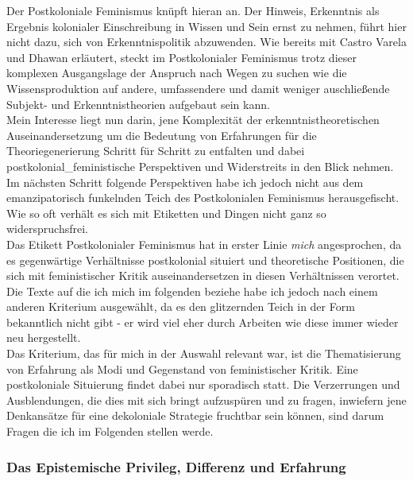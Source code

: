 Der Postkoloniale Feminismus knüpft hieran an. Der Hinweis, Erkenntnis als
Ergebnis kolonialer Einschreibung in Wissen und Sein ernst zu nehmen, führt
hier nicht dazu, sich von Erkenntnispolitik abzuwenden. Wie bereits mit Castro
Varela und Dhawan erläutert, steckt im Postkolonialer Feminismus trotz dieser
komplexen Ausgangslage der Anspruch nach Wegen zu suchen wie die
Wissensproduktion auf andere, umfassendere und damit weniger auschließende
Subjekt- und Erkenntnistheorien aufgebaut sein kann. \\
Mein Interesse liegt nun
darin, jene Komplexität der erkenntnistheoretischen Auseinandersetzung um die
Bedeutung von Erfahrungen für die Theoriegenerierung Schritt für Schritt zu
entfalten und dabei postkolonial\_feministische Perspektiven und Widerstreits in
den Blick nehmen. Im nächsten Schritt folgende Perspektiven habe ich jedoch
nicht aus dem emanzipatorisch funkelnden Teich des Postkolonialen Feminismus
herausgefischt. Wie so oft verhält es sich mit Etiketten und Dingen nicht ganz
so widerspruchsfrei.
\\

Das Etikett Postkolonialer Feminismus hat in erster Linie \textit{mich} angesprochen, da
es gegenwärtige Verhältnisse postkolonial situiert und theoretische Positionen,
die sich mit feministischer Kritik auseinandersetzen in diesen Verhältnissen
verortet. Die Texte auf die ich mich im folgenden beziehe habe ich jedoch nach
einem anderen Kriterium ausgewählt, da es den glitzernden Teich in der Form
bekanntlich nicht gibt - er wird viel eher durch Arbeiten wie diese immer
wieder neu hergestellt.\\
 Das Kriterium, das für mich in der Auswahl relevant
war, ist die Thematisierung von Erfahrung als Modi und Gegenstand von
feministischer Kritik. Eine postkoloniale Situierung findet dabei nur
sporadisch statt. Die Verzerrungen und Ausblendungen, die dies mit sich bringt
aufzuspüren und zu fragen, inwiefern jene Denkansätze für eine dekoloniale
Strategie fruchtbar sein können, sind darum Fragen die ich im Folgenden stellen
werde.

\subsubsection{Das Epistemische Privileg, Differenz und Erfahrung}

